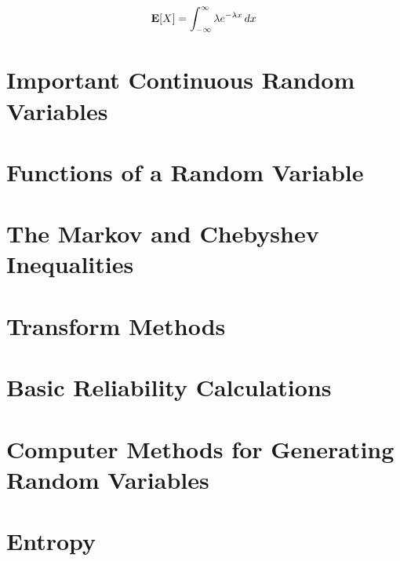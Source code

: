	\item {}

	\[
		{\bf E}[X]
		= \int_{-\infty}^\infty  \lambda e^{-\lambda x} {\, dx}
	\]


	
\eit

\section{Important Continuous Random Variables}

\section{Functions of a Random Variable}

\section{The Markov and Chebyshev Inequalities}

\section{Transform Methods}

\section{Basic Reliability Calculations}

\section{Computer Methods for Generating Random Variables}

\section{Entropy \optional}

